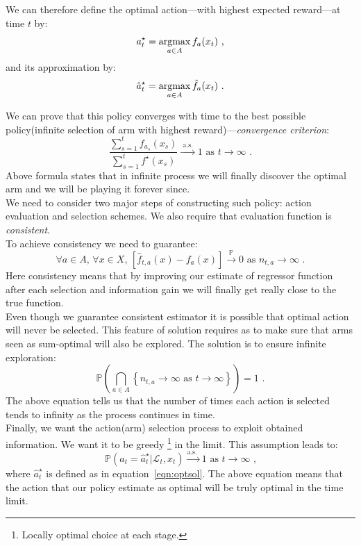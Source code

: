 \documentclass[12pt, a4paper, pdflatex, leqno]{report}
\newcommand{\argmax}{\operatornamewithlimits{argmax}}
\begin{document}
We can therefore define the optimal action---with highest expected reward---at time $t$ by:
\begin{equation}
  a_t^\star = \argmax_{a \in A} f_a (x_t) \text{ ,}
\end{equation}
and its approximation by:
\begin{equation}
  \label{eqn:optsol} \hat{a}_t^\star = \argmax_{a \in A} \hat{f}_a (x_t) \text{ .}
\end{equation}

We can prove that this policy converges with time to the best possible policy(infinite selection of arm with highest reward)---\emph{convergence criterion}:
\begin{equation}
  \label{eqn:convg}
  \frac
    {\sum_{s=1}^t f_{a_s} (x_s)}
    {\sum_{s=1}^t f^\star (x_s)}
  \xrightarrow{\text{ a.s.\ }} 1 \text{ as } t \rightarrow \infty \text{ .}
\end{equation}
Above formula states that in infinite process we will finally discover the optimal arm and we will be playing it forever since.\\


We need to consider two major steps of constructing such policy: action evaluation and selection schemes. We also require that evaluation function is \emph{consistent}.\\

To achieve consistency we need to guarantee:
$$
  \forall a \in A \text{, } \forall x \in X \text{, } \left[ \hat{f}_{t, a}(x) - f_a(x) \right] \xrightarrow{\mathbb{P}} 0 \text{ as } n_{t,a} \rightarrow \infty \text{ .}
$$
Here consistency means that by improving our estimate of regressor function after each selection and information gain we will finally get really close to the true function.\\

Even though we guarantee consistent estimator it is possible that optimal action will never be selected. This feature of solution requires as to make sure that arms seen as sum-optimal will also be explored. The solution is to ensure infinite exploration:
$$
  \mathbb{P} \left( \bigcap_{a \in A} \left\{ n_{t,a} \rightarrow \infty \text{ as } t \rightarrow \infty \right\} \right) = 1 \text{ .}
$$
The above equation tells us that the number of times each action is selected tends to infinity as the process continues in time.\\ 

Finally, we want the action(arm) selection process to exploit obtained information. We want it to be greedy \footnote{Locally optimal choice at each stage.} in the limit. This assumption leads to:
$$
  \mathbb{P} \left( a_t = \hat{a}_t^\star | \mathscr{L}_t, x_t \right) \xrightarrow{\text{a.s.\ }} 1 \text{ as } t \rightarrow \infty \text{ ,}
$$
where $\hat{a}_t^\star$ is defined as in equation~\ref{eqn:optsol}. The above equation means that the action that our policy estimate as optimal will be truly optimal in the time limit.\\
\end{document}
